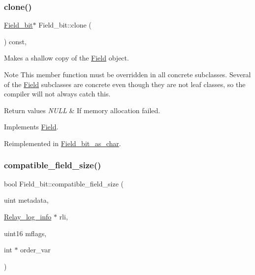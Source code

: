 \mbox{\label{classField__bit_a666845df221e87fbc65c725c232e4afd}} 
\subsubsection{\texorpdfstring{clone()}{clone()}\hspace{0.1cm}{\footnotesize\ttfamily [2/2]}}
{\footnotesize\ttfamily \mbox{\hyperlink{classField__bit}{Field\+\_\+bit}}$\ast$ Field\+\_\+bit\+::clone (\begin{DoxyParamCaption}{ }\end{DoxyParamCaption}) const\hspace{0.3cm}{\ttfamily [inline]}, {\ttfamily [virtual]}}

Makes a shallow copy of the \mbox{\hyperlink{classField}{Field}} object.

\begin{DoxyNote}{Note}
This member function must be overridden in all concrete subclasses. Several of the \mbox{\hyperlink{classField}{Field}} subclasses are concrete even though they are not leaf classes, so the compiler will not always catch this.
\end{DoxyNote}

\begin{DoxyRetVals}{Return values}
{\em N\+U\+LL} & If memory allocation failed. \\
\hline
\end{DoxyRetVals}


Implements \mbox{\hyperlink{classField_a01a9a9aa3a618941e839b1b8793c969d}{Field}}.



Reimplemented in \mbox{\hyperlink{classField__bit__as__char_a03166b5ed4492fcb071fd377c4c5e1b8}{Field\+\_\+bit\+\_\+as\+\_\+char}}.

\mbox{\label{classField__bit_abc1d459f116ca15efd4d0e84c5fc65fd}} 
\subsubsection{\texorpdfstring{compatible\+\_\+field\+\_\+size()}{compatible\_field\_size()}}
{\footnotesize\ttfamily bool Field\+\_\+bit\+::compatible\+\_\+field\+\_\+size (\begin{DoxyParamCaption}\item[{uint}]{metadata,  }\item[{\mbox{\hyperlink{classRelay__log__info}{Relay\+\_\+log\+\_\+info}} $\ast$}]{rli,  }\item[{uint16}]{mflags,  }\item[{int $\ast$}]{order\+\_\+var }\end{DoxyParamCaption})\hspace{0.3cm}{\ttfamily [virtual]}}

